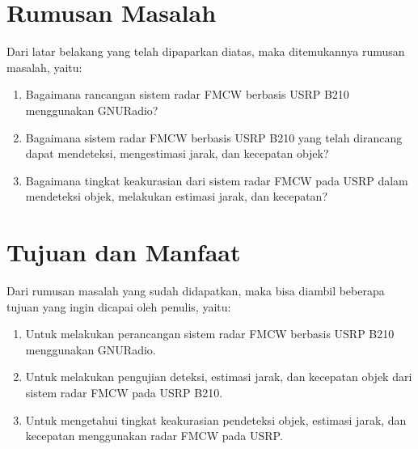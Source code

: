 \section{Rumusan Masalah}
Dari latar belakang yang telah dipaparkan diatas, maka ditemukannya rumusan masalah, yaitu:
\begin{enumerate}
	\item Bagaimana rancangan sistem radar FMCW berbasis USRP B210 menggunakan GNURadio? 
	\item Bagaimana sistem radar FMCW berbasis USRP B210 yang telah dirancang dapat mendeteksi, mengestimasi jarak, dan kecepatan objek?
	\item Bagaimana tingkat keakurasian dari sistem radar FMCW pada USRP dalam mendeteksi objek, melakukan estimasi jarak, dan kecepatan?
\end{enumerate} 

\section{Tujuan dan Manfaat}
Dari rumusan masalah yang sudah didapatkan, maka bisa diambil beberapa tujuan yang ingin dicapai oleh penulis, yaitu:

\begin{enumerate}
	\item Untuk melakukan perancangan sistem radar FMCW berbasis USRP B210 menggunakan GNURadio.
	\item Untuk melakukan pengujian deteksi, estimasi jarak, dan kecepatan objek dari sistem radar FMCW pada USRP B210.
	\item Untuk mengetahui tingkat keakurasian pendeteksi objek, estimasi jarak, dan kecepatan menggunakan radar FMCW pada USRP.
\end{enumerate}


